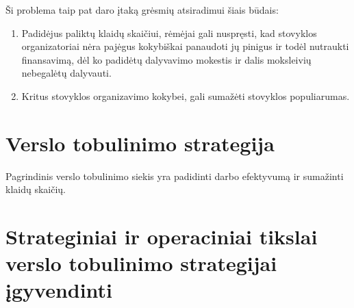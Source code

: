 Ši problema taip pat daro įtaką grėsmių atsiradimui šiais būdais:
\begin{enumerate}
  \item Padidėjus paliktų klaidų skaičiui, rėmėjai gali nuspręsti, kad 
    stovyklos organizatoriai nėra pajėgus kokybiškai panaudoti jų pinigus
    ir todėl nutraukti finansavimą, dėl ko padidėtų dalyvavimo mokestis ir
    dalis moksleivių nebegalėtų dalyvauti.
  \item Kritus stovyklos organizavimo kokybei, gali sumažėti stovyklos
    populiarumas.
\end{enumerate}



\section{Verslo tobulinimo strategija}

Pagrindinis verslo tobulinimo siekis yra padidinti darbo efektyvumą ir 
sumažinti klaidų skaičių.

\section{Strateginiai ir operaciniai tikslai verslo tobulinimo %
  strategijai įgyvendinti}

